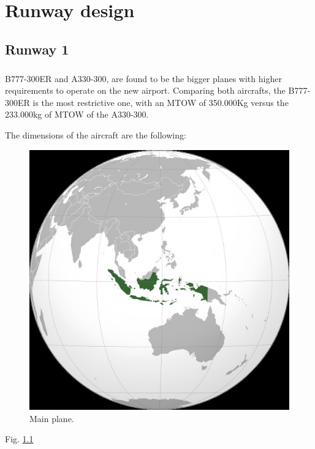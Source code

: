 \chapter{Runway design}

	\section{Runway 1}
	\paragraph{} B777-300ER and A330-300, are found to be the bigger planes with higher requirements to operate on the new airport. Comparing both aircrafts, the B777-300ER is the most restrictive one, with an MTOW of 350.000Kg versus the 233.000kg of MTOW of the A330-300.
	
	The dimensions of the aircraft are the following:
	
	\begin{figure}[H]
		\centering
		\includegraphics[clip, trim=0cm 0cm 0cm 0cm, width=1\textwidth]{./images/RUNWAY_DSGN/mainPlane}
		\caption{Main plane.} %
		\label{main_plane} %
	\end{figure}

	Fig. \ref{main_plane}
	
